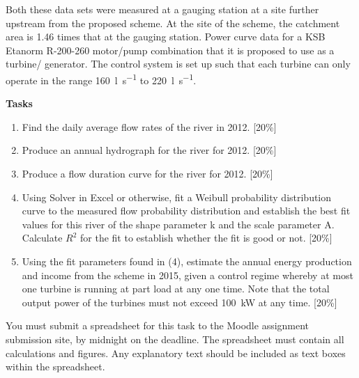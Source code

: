 \documentclass[a4paper,12pt,fleqn]{article}
\begin{document}
Both these data sets were measured at a gauging station at a site further upstream from the proposed scheme. At the site of the scheme, the catchment area is 1.46 times that at the gauging station. 
\newline\newline
Power curve data for a KSB Etanorm R-200-260 motor/pump combination that it is proposed to use as a turbine/ generator. The control system is set up such that each turbine can only operate in the range \SI{160}{\litre\per\second} to \SI{220}{\litre\per\second}.

\newpage
\textbf{Tasks}
\newline\newline

\begin{enumerate}[label=\alph*)]
\item Find the daily average flow rates of the river in 2012. [20\%] 
\item Produce an annual hydrograph for the river for 2012. [20\%]
\item Produce a flow duration curve for the river for 2012. [20\%]
\item Using Solver in Excel or otherwise, fit a Weibull probability distribution curve to the measured flow probability distribution and establish the best fit values for this river of the shape parameter k and the scale parameter A. Calculate $R^2$ for the fit to establish whether the fit is good or not. [20\%]
\item Using the fit parameters found in (4), estimate the annual energy production and income from the scheme in 2015, given a control regime whereby at most one turbine is running at part load at any one time. Note that the total output power of the turbines must not exceed \SI{100}{\kilo\watt} at any time. [20\%]
\end{enumerate}

You must submit a spreadsheet for this task to the Moodle assignment submission site, by midnight on the deadline. The spreadsheet must contain all calculations and figures. Any explanatory text should be included as text boxes within the spreadsheet. 

\label{finalpage}
\end{document}
